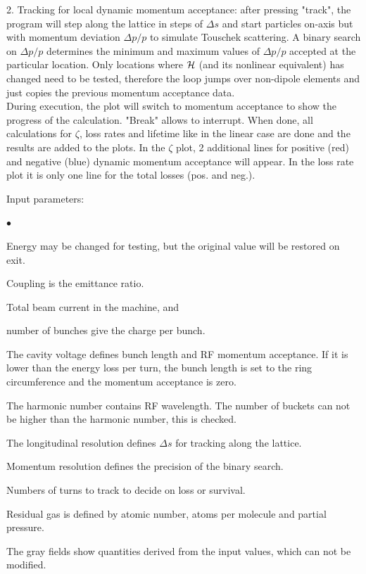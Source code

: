 \documentclass[12pt]{article}
\newenvironment{mylist}
  {\begin{list}{$\bullet$}{\parsep 0pt}}
  {\end{list}}
\begin{document}
2. Tracking for local dynamic momentum acceptance:
after pressing "track", the program will step along the lattice
in steps of $\Delta s$ and start particles on-axis but with momentum
deviation $\Delta p/p$ to simulate Touschek scattering.
A binary search on  $\Delta p/p$ determines the minimum and
maximum values of $\Delta p/p$ accepted at the particular location.
Only locations where ${\cal H}$ (and its nonlinear equivalent)
has changed need to be tested, therefore the loop jumps over
non-dipole elements and just copies the previous momentum acceptance data.\\
During execution, the plot will switch to momentum acceptance to show the progress
of the calculation. "Break" allows to interrupt.
When done, all calculations for $\zeta$, loss rates and lifetime like
in the linear case are done and the results are added to the plots.
In the $\zeta$ plot, 2 additional lines for positive (red) and negative (blue) dynamic
momentum acceptance will appear. In the loss rate plot it is only one line
for the total losses (pos. and neg.).

Input parameters:
\begin{mylist}
\item Energy may be changed for testing, but the original value will be restored on exit.
\item Coupling is the emittance ratio.
\item Total beam current in the machine, and
\item number of bunches give the charge per bunch.
\item The cavity voltage defines bunch length and RF momentum acceptance. If it
is lower than the energy loss per turn, the bunch length is set to the ring
circumference and the momentum acceptance is zero.
\item The harmonic number contains RF wavelength. The number of buckets can not
be higher than the harmonic number, this is checked.
\item The longitudinal resolution defines $\Delta s$ for tracking along the lattice.
\item Momentum resolution defines the precision of the binary search.
\item Numbers of turns to track to decide on loss or survival.
\item Residual gas is defined by atomic number, atoms per molecule and partial pressure.
\end{mylist}

The gray fields show quantities derived from the input values, which can not be modified.
\end{document}
